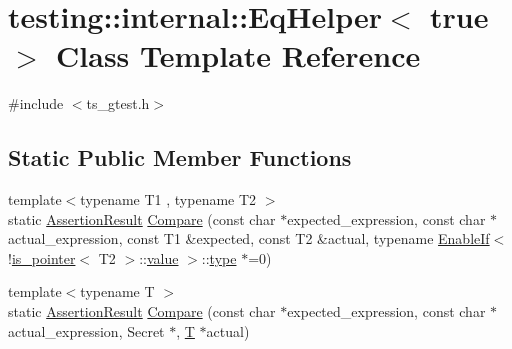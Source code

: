 \hypertarget{classtesting_1_1internal_1_1EqHelper_3_01true_01_4}{\section{testing\-:\-:internal\-:\-:Eq\-Helper$<$ true $>$ Class Template Reference}
\label{classtesting_1_1internal_1_1EqHelper_3_01true_01_4}
}


{\ttfamily \#include $<$ts\-\_\-gtest.\-h$>$}

\subsection*{Static Public Member Functions}
\begin{DoxyCompactItemize}
\item 
{\footnotesize template$<$typename T1 , typename T2 $>$ }\\static \hyperlink{classtesting_1_1AssertionResult}{Assertion\-Result} \hyperlink{classtesting_1_1internal_1_1EqHelper_3_01true_01_4_a70d6d7e3cb1df06ad6114f25e843fd6d}{Compare} (const char $\ast$expected\-\_\-expression, const char $\ast$actual\-\_\-expression, const T1 \&expected, const T2 \&actual, typename \hyperlink{structtesting_1_1internal_1_1EnableIf}{Enable\-If}$<$!\hyperlink{structtesting_1_1internal_1_1is__pointer}{is\-\_\-pointer}$<$ T2 $>$\-::\hyperlink{highgui__c_8h_ad4670c92695d4327c21292905a803901}{value} $>$\-::\hyperlink{imgproc__c_8h_a84612d8738bf935200cf32a103d8efe1}{type} $\ast$=0)
\item 
{\footnotesize template$<$typename T $>$ }\\static \hyperlink{classtesting_1_1AssertionResult}{Assertion\-Result} \hyperlink{classtesting_1_1internal_1_1EqHelper_3_01true_01_4_ab38e840297adb48f18767a1a99187fb3}{Compare} (const char $\ast$expected\-\_\-expression, const char $\ast$actual\-\_\-expression, Secret $\ast$, \hyperlink{calib3d_8hpp_a3efb9551a871ddd0463079a808916717}{T} $\ast$actual)
\end{DoxyCompactItemize}


